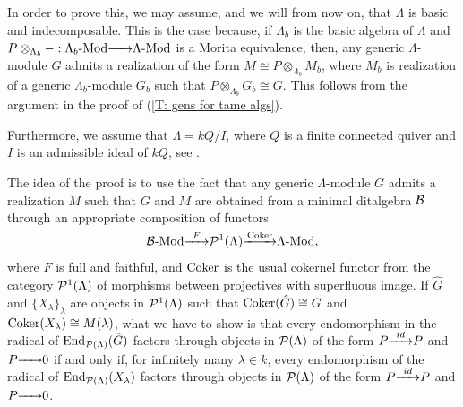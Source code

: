\documentclass{article}
\theoremstyle{definition}
\newcommand{\End}{{ \rm End }}
\newcommand{\Coker}{{ \rm Coker }}
\newcommand{\Mod}{{ \rm Mod }}
\newcommand{\g}{\hbox{-}}
\newcommand{\rightmap}[1]{\smash{\mathop{\hbox to 
20pt{\rightarrowfill}}\limits^{#1}}}
\begin{document}
In order to prove this,  
we may assume, and we will  from now on, that $\Lambda$ is basic and indecomposable. This is the case because,   if $\Lambda_b$ is the basic algebra of $\Lambda$ and $P\otimes_{\Lambda_b}-:\Lambda_b\g\Mod\rightmap{}\Lambda\g\Mod$ is a Morita equivalence, then, any generic $\Lambda$-module $G$ admits a  realization of the form $M\cong P\otimes_{\Lambda_b} M_b$, where $M_b$ is realization of a generic $\Lambda_b$-module $G_b$ such that    $P\otimes_{\Lambda_b} G_b\cong G$. This follows from the argument in the proof of (\ref{T: gens for tame algs}).    

Furthermore, we assume 
 that $\Lambda=kQ/I$, where $Q$ is a finite connected quiver and $I$ is an admissible ideal of $kQ$, see \cite[II]{ASS}.  

The idea of the proof is to use the fact that any generic $\Lambda$-module $G$ admits a realization  $M$ such that $G$ and $M$ are obtained from a minimal ditalgebra ${\cal B}$ through an appropriate composition of functors 
$${\cal B}\g\Mod\rightmap{F}{\cal P}^1(\Lambda)\rightmap{ \ \Coker \ }\Lambda\g\Mod,$$
where $F$ is full and faithful, and $\Coker$ is the usual cokernel functor from the category ${\cal P}^1(\Lambda)$ of morphisms between projectives with superfluous image.  If $\hat{G}$ and $\{X_\lambda\}_\lambda$ are objects in ${\cal P}^1(\Lambda)$ such that $\Coker (\hat{G})\cong G$ and $\Coker (X_\lambda)\cong M(\lambda)$, what we have to show is that every endomorphism  in the radical of $\End_{{\cal P}(\Lambda)}(\hat{G})$ factors through objects in ${\cal P}(\Lambda)$ of the form $P\rightmap{id}P$ and $P\rightmap{}0$ if and only if, for infinitely many $\lambda\in k$, 
every endomorphism of the radical of $\End_{{\cal P}(\Lambda)}(X_\lambda)$ factors through objects in ${\cal P}(\Lambda)$ of the form $P\rightmap{id}P$ and $P\rightmap{}0$. 
\end{document}
